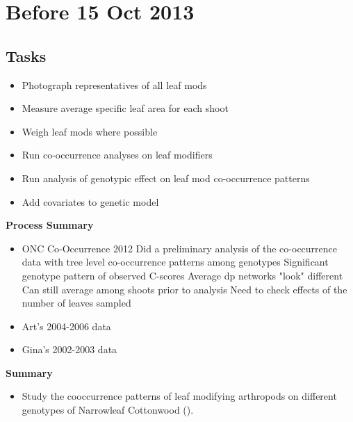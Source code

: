 \documentclass[12pt]{article}
\begin{document}
\section{Before 15 Oct 2013}

\subsection{Tasks}
\begin{itemize}
\item Photograph representatives of all leaf mods
\item Measure average specific leaf area for each shoot
\item Weigh leaf mods where possible
\item Run co-occurrence analyses on leaf modifiers
\item Run analysis of genotypic effect on leaf mod co-occurrence
  patterns
\item Add covariates to genetic model
\end{itemize}


\textbf{Process Summary}
\begin{itemize}
\item ONC Co-Occurrence 2012
  \subitem Did a preliminary analysis of the co-occurrence data with
  tree level co-occurrence patterns among genotypes
  \subitem Significant genotype pattern of observed C-scores
  \subitem Average dp networks "look" different
  \subitem Can still average among shoots prior to analysis
  \subitem Need to check effects of the number of leaves sampled
\item Art's 2004-2006 data
\item Gina's 2002-2003 data
\end{itemize}


\textbf{Summary}

\begin{itemize}
\item Study the cooccurrence patterns of leaf modifying arthropods on
  different genotypes of Narrowleaf Cottonwood ().

\end{itemize}
\end{document}

